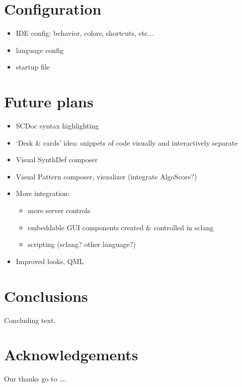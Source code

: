 \documentclass[11pt,a4paper]{article}
\begin{document}
\section{Configuration}

\begin{itemize}
 \item IDE config: behavior, colors, shortcuts, etc...
 \item language config
 \item startup file
\end{itemize}


\section{Future plans}

\begin{itemize}
 \item SCDoc syntax highlighting
 \item `Desk \& cards' idea: snippets of code visually and interactively separate
 \item Visual SynthDef composer
 \item Visual Pattern composer, visualizer (integrate AlgoScore?)
 \item More integration:
 \begin{itemize}
    \item more server controls
    \item  embeddable GUI components created \& controlled in sclang
    \item  scripting (sclang? other language?)
 \end{itemize}
 \item Improved looks, QML
\end{itemize}

\section{Conclusions}

Concluding text.

\section{Acknowledgements}

Our thanks go to \ldots .



\end{document}
